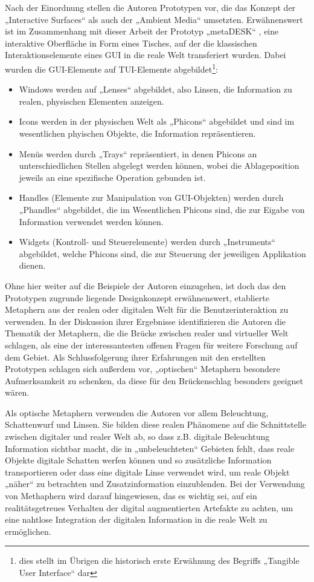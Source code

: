 Nach der Einordnung stellen die Autoren Prototypen vor, die das Konzept der „Interactive Surfaces“ als auch der „Ambient Media“ umsetzten. Erwähnenswert ist im Zusammenhang mit dieser Arbeit der Prototyp „metaDESK“ \citep{Ullmer97}, eine interaktive Oberfläche in Form eines Tisches, auf der die klassischen Interaktionselemente eines \gls{GUI} in die reale Welt transferiert wurden. Dabei wurden die \gls{GUI}-Elemente auf \gls{TUI}-Elemente abgebildet\footnote{dies stellt im Übrigen die historisch erste Erwähnung des Begriffs „Tangible User Interface“ dar}: 
\begin{itemize}
	\item Windows werden auf „Lenses“ abgebildet, also Linsen, die Information zu realen, physischen Elementen anzeigen.
	\item Icons werden in der physischen Welt als „Phicons“ abgebildet und sind im wesentlichen phyischen Objekte, die Information repräsentieren.
	\item Menüs werden durch „Trays“ repräsentiert, in denen Phicons an unterschiedlichen Stellen abgelegt werden können, wobei die Ablageposition jeweils an eine spezifische Operation gebunden ist. 
	\item Handles (Elemente zur Manipulation von GUI-Objekten) werden durch „Phandles“ abgebildet, die im Wesentlichen Phicons sind, die zur Eigabe von Information verwendet werden können.
	\item Widgets (Kontroll- und Steuerelemente) werden durch „Instruments“ abgebildet, welche Phicons sind, die zur Steuerung der jeweiligen Applikation dienen.
\end{itemize}

Ohne hier weiter auf die Beispiele der Autoren einzugehen, ist doch das den Prototypen zugrunde liegende Designkonzept erwähnenswert, etablierte Metaphern aus der realen oder digitalen Welt für die Benutzerinteraktion zu verwenden. In der Diskussion ihrer Ergebnisse identifizieren die Autoren die Thematik der Metaphern, die die Brücke zwischen realer und virtueller Welt schlagen, als eine der interessantesten offenen Fragen für weitere Forschung auf dem Gebiet. Als Schlussfolgerung ihrer Erfahrungen mit den erstellten Prototypen schlagen sich außerdem vor, „optischen“ Metaphern besondere Aufmerksamkeit zu schenken, da diese für den Brückenschlag besonders geeignet wären. 

Als optische Metaphern verwenden die Autoren vor allem Beleuchtung, Schattenwurf und Linsen. Sie bilden diese realen Phänomene auf die Schnittstelle zwischen digitaler und realer Welt ab, so dass z.B. digitale Beleuchtung Information sichtbar macht, die in „unbeleuchteten“ Gebieten fehlt, dass reale Objekte digitale Schatten werfen können und so zusätzliche Information transportieren oder dass eine digitale Linse verwendet wird, um reale Objekt „näher“ zu betrachten und Zusatzinformation einzublenden. Bei der Verwendung von Methaphern wird darauf hingewiesen, das es wichtig sei, auf ein realitätsgetreues Verhalten der digital augmentierten Artefakte zu achten, um eine nahtlose Integration der digitalen Information in die reale Welt zu ermöglichen.

